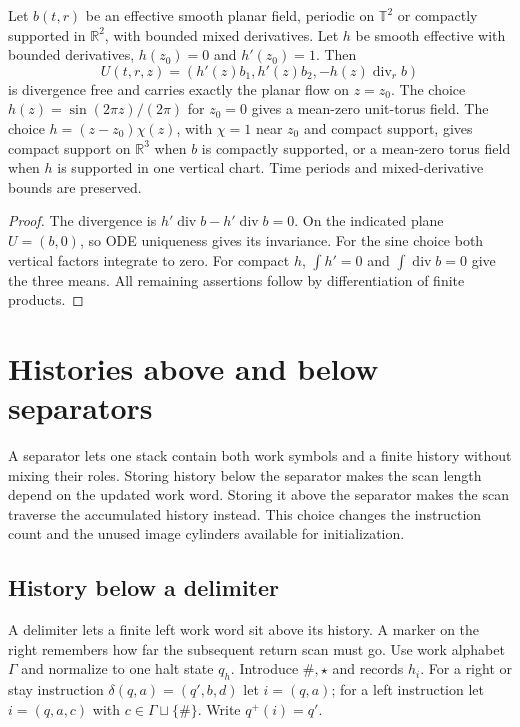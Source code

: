\begin{lemma}\label{lem:sa-invariant-lift}
Let $b(t,r)$ be an effective smooth planar field, periodic on $\mathbb T^2$
or compactly supported in $\mathbb R^2$, with bounded mixed derivatives.
Let $h$ be smooth effective with bounded derivatives, $h(z_0)=0$ and
$h'(z_0)=1$.  Then
\begin{equation}\label{eq:sa-lift}
 U(t,r,z)=(h'(z)b_1,h'(z)b_2,-h(z)\operatorname{div}_r b)
\end{equation}
is divergence free and carries exactly the planar flow on $z=z_0$.
The choice $h(z)=\sin(2\pi z)/(2\pi)$ for $z_0=0$ gives a mean-zero
unit-torus field.  The choice $h=(z-z_0)\chi(z)$, with $\chi=1$ near
$z_0$ and compact support, gives compact support on $\mathbb R^3$ when
$b$ is compactly supported, or a mean-zero torus field when $h$ is
supported in one vertical chart.  Time periods and mixed-derivative
bounds are preserved.
\end{lemma}
\begin{proof}
The divergence is $h'\operatorname{div}b-h'\operatorname{div}b=0$.
On the indicated plane $U=(b,0)$, so ODE uniqueness gives its invariance.
For the sine choice both vertical factors integrate to zero.  For compact
$h$, $\int h'=0$ and $\int\operatorname{div}b=0$ give the three means.
All remaining assertions follow by differentiation of finite products.
\end{proof}

\section{Histories above and below separators}
\label{sec:sa-separator-histories}
A separator lets one stack contain both work symbols and a finite history
without mixing their roles.  Storing history below the separator makes
the scan length depend on the updated work word.  Storing it above the
separator makes the scan traverse the accumulated history instead.  This
choice changes the instruction count and the unused image cylinders
available for initialization.

\subsection{History below a delimiter}\label{subsec:sa-delimiter}
A delimiter lets a finite left work word sit above its history.  A marker
on the right remembers how far the subsequent return scan must go.
Use work alphabet $\Gamma$ and normalize to one halt state $q_h$.
Introduce $\#,\star$ and records
$h_i$.  For a right or stay instruction $\delta(q,a)=(q',b,d)$ let
$i=(q,a)$; for a left instruction let $i=(q,a,c)$ with
$c\in\Gamma\sqcup\{\#\}$.  Write $q^+(i)=q'$.

